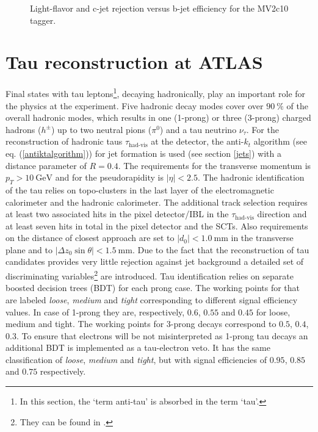 \begin{figure}
\begin{subfigure}[t]{0.49\textwidth}
  \end{subfigure}
 \caption[Light-flavor (a) and c-jet rejection (b) versus b-jet efficiency for the MV2c10 tagger.]{Light-flavor and c-jet rejection versus b-jet efficiency for the MV2c10 tagger. \cite{MV2c10}}
 \label{btageff}
\end{figure}
\section{Tau reconstruction at ATLAS}\label{taus}
Final states with tau leptons\footnote{In this section, the `term anti-tau' is absorbed in the term `tau'.}, decaying hadronically, play an important role for the physics at the {\ATLAS} experiment.  Five hadronic decay modes cover over $\SI{90}{\percent}$ of the overall hadronic modes, which results in one (1-prong) or three (3-prong) charged hadrons ($h^\pm$) up to two neutral pions ($\pi^0$) and a tau neutrino $\nu_\tau$. \cite{tauPerformance2} 
For the reconstruction of hadronic taus $\tau_\text{had-vis}$ at the {\ATLAS} detector, the anti-$k_t$ algorithm (see eq. (\ref{antiktalgorithm})) for jet formation is used (see section \ref{jets}) with a distance parameter of $R=0.4$. The requirements for the transverse momentum is $p_T>\SI{10}{\giga\electronvolt}$ and for the pseudorapidity is $|\eta|<2.5$. The hadronic identification of the tau relies on topo-clusters in the last layer of the electromagnetic calorimeter and the hadronic calorimeter. The additional track selection requires at least two associated hits in the pixel detector/IBL in the $\tau_\text{had-vis}$ direction and at least seven hits in total in the pixel detector and the SCTs. Also requirements on the distance of closest approach are set to $|d_0|<\SI{1.0}{\milli\meter}$ in the transverse plane and to $|\Delta z_0\sin\theta|<\SI{1.5}{\milli\meter}$.\cite{tauPerformance}\newline
Due to the fact that the reconstruction of tau candidates provides very little rejection against jet background a detailed set of discriminating variables\footnote{They can be found in \cite{tauPerformance}.} are introduced. Tau identification relies on separate boosted decision trees (BDT) for each prong case. The working points for that are labeled \textit{loose}, \textit{medium} and \textit{tight} corresponding to different signal efficiency values. In case of 1-prong they are, respectively, $0.6$, $0.55$ and $0.45$ for loose, medium and tight. The working points for 3-prong decays correspond to $0.5$, $0.4$, $0.3$. \cite{tauPerformance}\newline
To ensure that electrons will be not misinterpreted as 1-prong tau decays an additional BDT is implemented as a tau-electron veto. It has the same classification of \textit{loose}, \textit{medium} and \textit{tight}, but with signal efficiencies of $0.95$, $0.85$ and $0.75$ respectively. \cite{elBDT}
%
%
